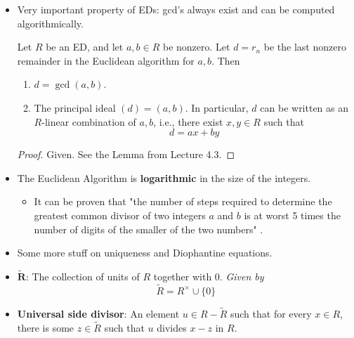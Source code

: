 \documentclass[../notes.tex]{subfiles}
\begin{document}
\begin{itemize}
\begin{proposition}
        Let $R$ be an integral domain. If two elements $d,d'$ of $R$ generate the same principal ideal, i.e., $(d)=(d')$, then $d'=ud$ for some unit $u\in R$. In particular, if $d,d'$ are both greatest common divisors of $a,b$, then $d'=ud$ for some unit $u$.
        \begin{proof}
            Given. Very slick.
        \end{proof}
    \end{proposition}
    \item Very important property of EDs: gcd's always exist and can be computed algorithmically.
    \begin{theorem}\label{trm:8.4}
        Let $R$ be an ED, and let $a,b\in R$ be nonzero. Let $d=r_n$ be the last nonzero remainder in the Euclidean algorithm for $a,b$. Then
        \begin{enumerate}
            \item $d=\gcd(a,b)$.
            \item The principal ideal $(d)=(a,b)$. In particular, $d$ can be written as an $R$-linear combination of $a,b$, i.e., there exist $x,y\in R$ such that
            \begin{equation*}
                d = ax+by
            \end{equation*}
        \end{enumerate}
        \begin{proof}
            Given. See the Lemma from Lecture 4.3.
        \end{proof}
    \end{theorem}
    \item The Euclidean Algorithm is \textbf{logarithmic} in the size of the integers.
    \begin{itemize}
        \item It can be proven that "the number of steps required to determine the greatest common divisor of two integers $a$ and $b$ is at worst 5 times the number of digits of the smaller of the two numbers" \parencite[276]{bib:DummitFoote}.
    \end{itemize}
    \item Some more stuff on uniqueness and Diophantine equations.
    \item $\bm{\widetilde{R}}$: The collection of units of $R$ together with 0. \emph{Given by}
    \begin{equation*}
        \widetilde{R} = R^\times\cup\{0\}
    \end{equation*}
    \item \textbf{Universal side divisor}: An element $u\in R-\widetilde{R}$ such that for every $x\in R$, there is some $z\in\widetilde{R}$ such that $u$ divides $x-z$ in $R$.

\end{itemize}
\end{document}
